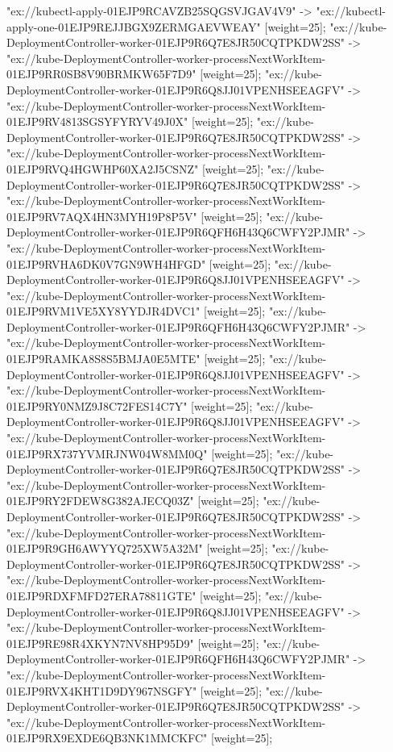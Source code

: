 {"ex://kubectl-apply-01EJP9RCAVZB25SQGSVJGAV4V9" -> "ex://kubectl-apply-one-01EJP9REJJBGX9ZERMGAEVWEAY" [weight=25];
"ex://kube-DeploymentController-worker-01EJP9R6Q7E8JR50CQTPKDW2SS" -> "ex://kube-DeploymentController-worker-processNextWorkItem-01EJP9RR0SB8V90BRMKW65F7D9" [weight=25];
"ex://kube-DeploymentController-worker-01EJP9R6Q8JJ01VPENHSEEAGFV" -> "ex://kube-DeploymentController-worker-processNextWorkItem-01EJP9RV4813SGSYFYRYV49J0X" [weight=25];
"ex://kube-DeploymentController-worker-01EJP9R6Q7E8JR50CQTPKDW2SS" -> "ex://kube-DeploymentController-worker-processNextWorkItem-01EJP9RVQ4HGWHP60XA2J5CSNZ" [weight=25];
"ex://kube-DeploymentController-worker-01EJP9R6Q7E8JR50CQTPKDW2SS" -> "ex://kube-DeploymentController-worker-processNextWorkItem-01EJP9RV7AQX4HN3MYH19P8P5V" [weight=25];
"ex://kube-DeploymentController-worker-01EJP9R6QFH6H43Q6CWFY2PJMR" -> "ex://kube-DeploymentController-worker-processNextWorkItem-01EJP9RVHA6DK0V7GN9WH4HFGD" [weight=25];
"ex://kube-DeploymentController-worker-01EJP9R6Q8JJ01VPENHSEEAGFV" -> "ex://kube-DeploymentController-worker-processNextWorkItem-01EJP9RVM1VE5XY8YYDJR4DVC1" [weight=25];
"ex://kube-DeploymentController-worker-01EJP9R6QFH6H43Q6CWFY2PJMR" -> "ex://kube-DeploymentController-worker-processNextWorkItem-01EJP9RAMKA8S8S5BMJA0E5MTE" [weight=25];
"ex://kube-DeploymentController-worker-01EJP9R6Q8JJ01VPENHSEEAGFV" -> "ex://kube-DeploymentController-worker-processNextWorkItem-01EJP9RY0NMZ9J8C72FES14C7Y" [weight=25];
"ex://kube-DeploymentController-worker-01EJP9R6Q8JJ01VPENHSEEAGFV" -> "ex://kube-DeploymentController-worker-processNextWorkItem-01EJP9RX737YVMRJNW04W8MM0Q" [weight=25];
"ex://kube-DeploymentController-worker-01EJP9R6Q7E8JR50CQTPKDW2SS" -> "ex://kube-DeploymentController-worker-processNextWorkItem-01EJP9RY2FDEW8G382AJECQ03Z" [weight=25];
"ex://kube-DeploymentController-worker-01EJP9R6Q7E8JR50CQTPKDW2SS" -> "ex://kube-DeploymentController-worker-processNextWorkItem-01EJP9R9GH6AWYYQ725XW5A32M" [weight=25];
"ex://kube-DeploymentController-worker-01EJP9R6Q7E8JR50CQTPKDW2SS" -> "ex://kube-DeploymentController-worker-processNextWorkItem-01EJP9RDXFMFD27ERA78811GTE" [weight=25];
"ex://kube-DeploymentController-worker-01EJP9R6Q8JJ01VPENHSEEAGFV" -> "ex://kube-DeploymentController-worker-processNextWorkItem-01EJP9RE98R4XKYN7NV8HP95D9" [weight=25];
"ex://kube-DeploymentController-worker-01EJP9R6QFH6H43Q6CWFY2PJMR" -> "ex://kube-DeploymentController-worker-processNextWorkItem-01EJP9RVX4KHT1D9DY967NSGFY" [weight=25];
"ex://kube-DeploymentController-worker-01EJP9R6Q7E8JR50CQTPKDW2SS" -> "ex://kube-DeploymentController-worker-processNextWorkItem-01EJP9RX9EXDE6QB3NK1MMCKFC" [weight=25];
}
